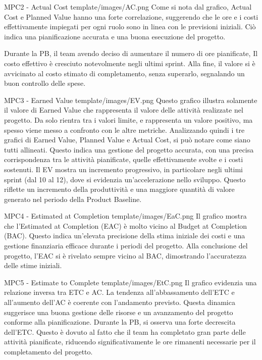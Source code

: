 \Met
{ %
    MPC2 - Actual Cost
}
{ %
    template/images/AC.png
}
{ %
    Come si nota dal grafico, Actual Cost e Planned Value hanno una forte correlazione, suggerendo che le ore e i costi effettivamente impiegati per ogni ruolo sono in linea con le previsioni iniziali.
    Ciò indica una pianificazione accurata e una buona esecuzione del progetto.
}
{ %
    Durante la PB, il team avendo deciso di aumentare il numero di ore pianificate, Il costo effettivo è cresciuto notevolmente negli ultimi sprint. Alla fine, il valore si è avvicinato al costo stimato di completamento, senza superarlo, segnalando un buon controllo delle spese.

}

\Met
{ %
    MPC3 - Earned Value
}
{ %
    template/images/EV.png
}
{ %
    Questo grafico illustra solamente il valore di Earned Value che rappresenta il valore delle attività realizzate nel progetto.
    Da solo rientra tra i valori limite, e rappresenta un valore positivo, ma spesso viene messo a confronto con le altre metriche.
    Analizzando quindi i tre grafici di Earned Value, Planned Value e Actual Cost, si può notare come siano tutti allineati. 
    Questo indica una gestione del progetto accurata, con una precisa corrispondenza tra le attività pianificate, quelle effettivamente svolte e i costi sostenuti.
}
{ %
    Il EV mostra un incremento progressivo, in particolare negli ultimi sprint (dal 10 al 12), dove si evidenzia un'accelerazione nello sviluppo. Questo riflette un incremento della produttività e una maggiore quantità di valore generato nel periodo della Product Baseline.
}

\Met
{ %
    MPC4 - Estimated at Completion
}
{ %
    template/images/EaC.png
}
{ %
    Il grafico mostra che l'Estimated at Completion (EAC) è molto vicino al Budget at Completion (BAC).
    Questo indica un'elevata precisione della stima iniziale dei costi e una gestione finanziaria efficace durante i periodi del progetto. 
}
{ %
    Alla conclusione del progetto, l’EAC si è rivelato sempre vicino al BAC, dimostrando l’accuratezza delle stime iniziali.
}


\Met
{ %
    MPC5 - Estimate to Complete
}
{ %
    template/images/EtC.png
}
{ %
    Il grafico evidenzia una relazione inversa tra ETC e AC.
    La tendenza all'abbassamento dell'ETC e all'aumento dell'AC è coerente con l'andamento previsto. 
    Questa dinamica suggerisce una buona gestione delle risorse e un avanzamento del progetto conforme alla pianificazione.
}
{ %
    Durante la PB, si osserva una forte decrescita dell'ETC. Questo è dovuto al fatto che il team ha completato gran parte delle attività pianificate, riducendo significativamente le ore rimanenti necessarie per il completamento del progetto.
}


